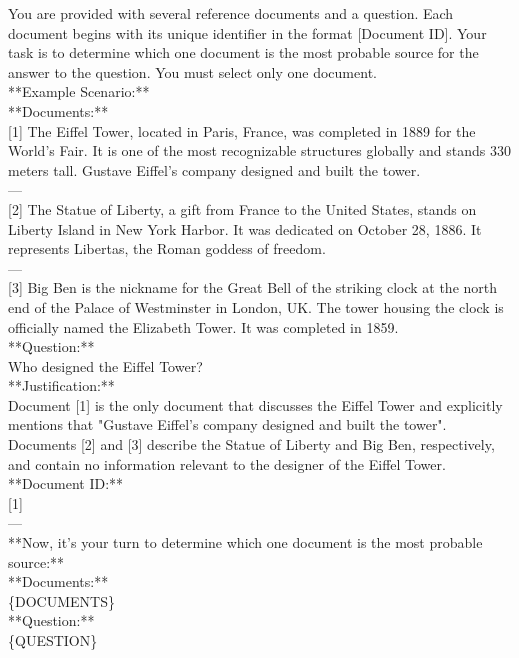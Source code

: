 
\begin{tcolorbox}[
    enhanced,
    colback=white, %
    colframe=black, %
    arc=5mm, %
    boxrule=1pt,
    left=2mm, %
    right=2mm, %
    top=1mm, %
    bottom=1mm %
]

You are provided with several reference documents and a question. Each document begins with its unique identifier in the format [Document ID]. Your task is to determine which one document is the most probable source for the answer to the question. You must select only one document.\\

**Example Scenario:**\\

**Documents:**\\{}
[1] The Eiffel Tower, located in Paris, France, was completed in 1889 for the World's Fair. It is one of the most recognizable structures globally and stands 330 meters tall. Gustave Eiffel's company designed and built the tower.\\
---\\{}
[2] The Statue of Liberty, a gift from France to the United States, stands on Liberty Island in New York Harbor. It was dedicated on October 28, 1886. It represents Libertas, the Roman goddess of freedom.\\
---\\{}
[3] Big Ben is the nickname for the Great Bell of the striking clock at the north end of the Palace of Westminster in London, UK. The tower housing the clock is officially named the Elizabeth Tower. It was completed in 1859.\\

**Question:**\\
Who designed the Eiffel Tower?\\

**Justification:**\\
Document [1] is the only document that discusses the Eiffel Tower and explicitly mentions that "Gustave Eiffel's company designed and built the tower". Documents [2] and [3] describe the Statue of Liberty and Big Ben, respectively, and contain no information relevant to the designer of the Eiffel Tower.\\
**Document ID:**\\{}
[1]\\
---\\

**Now, it's your turn to determine which one document is the most probable source:**\\

**Documents:**\\
\{DOCUMENTS\}\\

**Question:**\\
\{QUESTION\}\\


\end{tcolorbox}